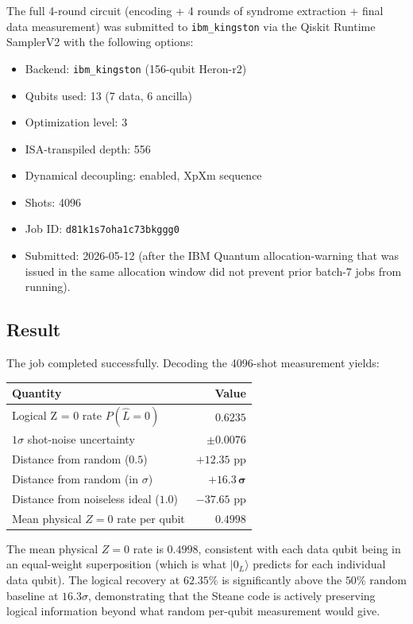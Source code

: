 \documentclass[11pt,letterpaper]{article}
\begin{document}
The full 4-round circuit (encoding + 4 rounds of syndrome extraction + final data measurement) was submitted to \texttt{ibm\_kingston} via the Qiskit Runtime SamplerV2 with the following options:
\begin{itemize}[leftmargin=*,itemsep=0pt]
\item Backend: \texttt{ibm\_kingston} (156-qubit Heron-r2)
\item Qubits used: 13 (7 data, 6 ancilla)
\item Optimization level: 3
\item ISA-transpiled depth: 556
\item Dynamical decoupling: enabled, XpXm sequence
\item Shots: 4096
\item Job ID: \texttt{d81k1s7oha1c73bkggg0}
\item Submitted: 2026-05-12 (after the IBM Quantum allocation-warning that was issued in the same allocation window did not prevent prior batch-7 jobs from running).
\end{itemize}

\subsection{Result}

The job completed successfully. Decoding the 4096-shot measurement yields:

\begin{center}
\begin{tabular}{lr}
\toprule
Quantity & Value \\
\midrule
Logical Z = 0 rate $P(\hat L = 0)$ & $\bm{0.6235}$ \\
$1\sigma$ shot-noise uncertainty & $\pm 0.0076$ \\
Distance from random ($0.5$) & $+12.35$ pp \\
Distance from random (in $\sigma$) & $\bm{+16.3\,\sigma}$ \\
Distance from noiseless ideal ($1.0$) & $-37.65$ pp \\
Mean physical $Z = 0$ rate per qubit & $0.4998$ \\
\bottomrule
\end{tabular}
\end{center}

The mean physical $Z = 0$ rate is $0.4998$, consistent with each data qubit being in an equal-weight superposition (which is what $|0_L\rangle$ predicts for each individual data qubit). The logical recovery at $62.35\%$ is significantly above the $50\%$ random baseline at $16.3\sigma$, demonstrating that the Steane code is actively preserving logical information beyond what random per-qubit measurement would give.
\end{document}
